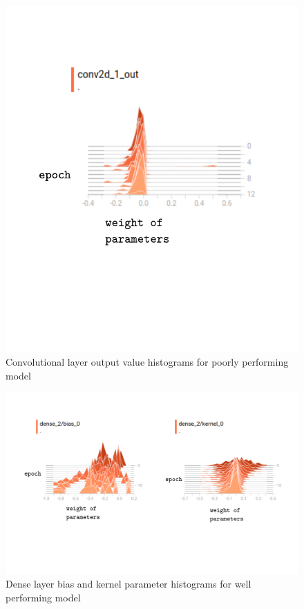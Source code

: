\documentclass{article}
\begin{document}
\begin{figure}[h]
  \includegraphics[scale=0.8]{badearlyout.pdf}
  \caption{Convolutional layer output value histograms for poorly performing model}
  \label{fig:badearlyout}
\end{figure}

\begin{figure}[h]
  \includegraphics[width=\linewidth]{gooddense.pdf}
  \caption{Dense layer bias and kernel parameter histograms for well performing model}
  \label{fig:gooddenseweights}
\end{figure}
\end{document}
